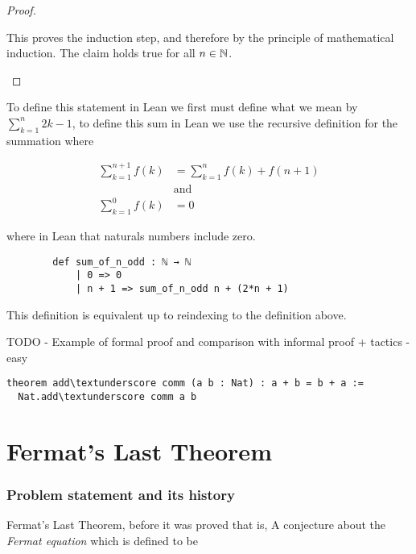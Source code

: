 \begin{example}
\begin{proof}
\begin{itemize}
            This proves the induction step, and therefore by the principle of mathematical induction. The claim holds true for all $n \in \mathbb{N}$.
        \end{itemize}
    \end{proof}

    To define this statement in Lean we first must define what we mean by $\sum_{k = 1}^{n} 2k - 1$, to define this sum in Lean we use the recursive definition
    for the summation where 

    \begin{align*}
        \sum_{k = 1}^{n + 1} f(k) &= \sum_{k = 1}^{n} f(k) + f(n + 1) \tag{for $n \geq 0$}\\
            &\text{and}\\
        \sum_{k = 1}^{0} f(k) &= 0
    \end{align*}

    where in Lean that naturals numbers include zero.

    \begin{verbatim}
        def sum_of_n_odd : ℕ → ℕ
            | 0 => 0
            | n + 1 => sum_of_n_odd n + (2*n + 1)
    \end{verbatim}

    This definition is equivalent up to reindexing to the definition above.



    

    



    

\end{example}






TODO - Example of formal proof and comparison with informal proof + tactics - easy


\begin{verbatim}
theorem add\textunderscore comm (a b : Nat) : a + b = b + a :=
  Nat.add\textunderscore comm a b
\end{verbatim}


\section{Fermat's Last Theorem}


\subsubsection{Problem statement and its history}
Fermat's Last Theorem, before it was proved that is, A conjecture about the \textit{Fermat equation} which is defined to be

